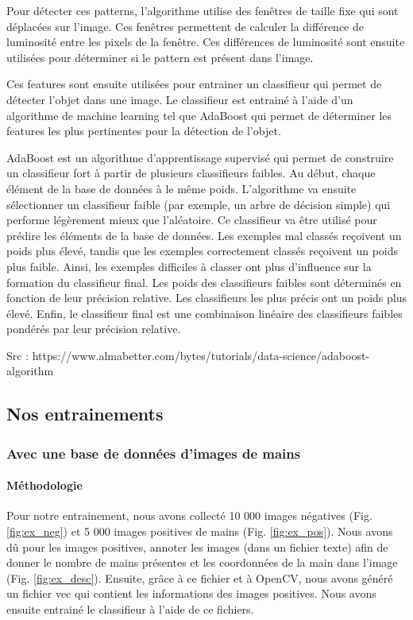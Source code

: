 \documentclass[11pt]{article}
\begin{document}
\bigbreak

Pour détecter ces patterns, l'algorithme utilise des fenêtres de taille fixe qui sont déplacées sur l'image. Ces fenêtres permettent de calculer la différence de luminosité entre les pixels de la fenêtre. Ces différences de luminosité sont ensuite utilisées pour déterminer si le pattern est présent dans l'image. 

\bigbreak

Ces features sont ensuite utilisées pour entrainer un classifieur qui permet de détecter l'objet dans une image. Le classifieur est entrainé à l'aide d'un algorithme de machine learning tel que AdaBoost qui permet de déterminer les features les plus pertinentes pour la détection de l'objet. \bigbreak

AdaBoost est un algorithme d'apprentissage supervisé qui permet de construire un classifieur fort à partir de plusieurs classifieurs faibles.
Au début, chaque élément de la base de données à le même poids. L'algorithme va ensuite sélectionner un classifieur faible (par exemple, un arbre de décision simple) qui performe légèrement mieux que l'aléatoire. Ce classifieur va être utilisé pour prédire les éléments de la base de données. Les exemples mal classés reçoivent un poids plus élevé, tandis que les exemples correctement classés reçoivent un poids plus faible. Ainsi, les exemples difficiles à classer ont plus d'influence sur la formation du classifieur final. Les poids des classifieurs faibles sont déterminés en fonction de leur précision relative. Les classifieurs les plus précis ont un poids plus élevé. Enfin, le classifieur final est une combinaison linéaire des classifieurs faibles pondérés par leur précision relative. \bigbreak


{\LARGE Src : https://www.almabetter.com/bytes/tutorials/data-science/adaboost-algorithm}

\subsection{Nos entrainements}
\subsubsection{Avec une base de données d'images de mains}
\paragraph{Méthodologie}
Pour notre entrainement, nous avons collecté 10 000 images négatives (Fig. \ref{fig:ex_neg}) et 5 000 images positives de mains (Fig. \ref{fig:ex_pos}). Nous avons dû pour les images positives, annoter les images (dans un fichier texte) afin de donner le nombre de mains présentes et les coordonnées de la main dans l'image (Fig. \ref{fig:ex_desc}). Ensuite, grâce à ce fichier et à OpenCV, nous avons généré un fichier vec qui contient les informations des images positives. Nous avons ensuite entrainé le classifieur à l'aide de ce fichiers.
\bigbreak
\end{document}
